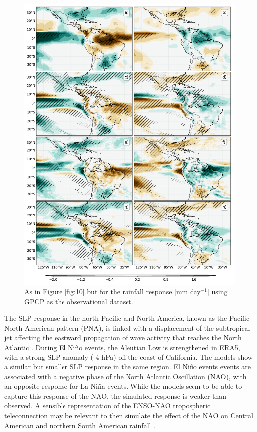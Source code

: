 
\begin{figure}[t!]
\centering
 \includegraphics[width=0.81\linewidth]{figures/ensopr_3}
 \caption[ENSO precipitation teleconnections to the AMS]{As in Figure \ref{fig:10} but for the rainfall response [mm day$^{-1}$] using GPCP as the observational dataset.}
\label{fig:11}
\end{figure}

The SLP response in the north Pacific and North America, known as the Pacific North-American pattern (PNA), is linked with a displacement of the subtropical jet affecting the eastward propagation of wave activity that reaches the North Atlantic  \citep[e.g.][]{bayr2019,jimenezesteve2020}.
During  El Ni\~no events, the Aleutian Low is strengthened in ERA5, with a strong SLP anomaly (-4 hPa) off the coast of California. The models show a similar but smaller SLP response in the same region.  El Ni\~no events events are associated with a negative phase of the North Atlantic Oscillation (NAO), with an opposite response for La Ni\~na events. While the models seem to be able to capture this response of the NAO, the simulated response is weaker than observed.   A sensible representation of the ENSO-NAO tropospheric teleconnection may be relevant to then simulate the effect of the NAO on Central American and northern South American rainfall \citep{giannini2000,giannini2004}.  





